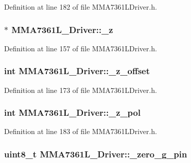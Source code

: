 \-Definition at line 182 of file \-M\-M\-A7361\-L\-Driver.\-h.

\hypertarget{class_m_m_a7361_l___driver_a0416de491924bc911e577fc6b3ad6221}{
\subsubsection[{\-\_\-z}]{$\ast$ {\bf \-M\-M\-A7361\-L\-\_\-\-Driver\-::\-\_\-z}}}\label{class_m_m_a7361_l___driver_a0416de491924bc911e577fc6b3ad6221}


\-Definition at line 157 of file \-M\-M\-A7361\-L\-Driver.\-h.

\hypertarget{class_m_m_a7361_l___driver_a2896398d25d793b63335dabaf46c7a87}{
\subsubsection[{\-\_\-z\-\_\-offset}]{\setlength{\rightskip}{0pt plus 5cm}int {\bf \-M\-M\-A7361\-L\-\_\-\-Driver\-::\-\_\-z\-\_\-offset}}}\label{class_m_m_a7361_l___driver_a2896398d25d793b63335dabaf46c7a87}


\-Definition at line 173 of file \-M\-M\-A7361\-L\-Driver.\-h.

\hypertarget{class_m_m_a7361_l___driver_a1abc134bb9adaee3a89e65a784e8b831}{
\subsubsection[{\-\_\-z\-\_\-pol}]{\setlength{\rightskip}{0pt plus 5cm}int {\bf \-M\-M\-A7361\-L\-\_\-\-Driver\-::\-\_\-z\-\_\-pol}}}\label{class_m_m_a7361_l___driver_a1abc134bb9adaee3a89e65a784e8b831}


\-Definition at line 183 of file \-M\-M\-A7361\-L\-Driver.\-h.

\hypertarget{class_m_m_a7361_l___driver_a09fb128f03f2c1b425e5bb4d4ac4dcb1}{
\subsubsection[{\-\_\-zero\-\_\-g\-\_\-pin}]{\setlength{\rightskip}{0pt plus 5cm}uint8\-\_\-t {\bf \-M\-M\-A7361\-L\-\_\-\-Driver\-::\-\_\-zero\-\_\-g\-\_\-pin}}}\label{class_m_m_a7361_l___driver_a09fb128f03f2c1b425e5bb4d4ac4dcb1}


